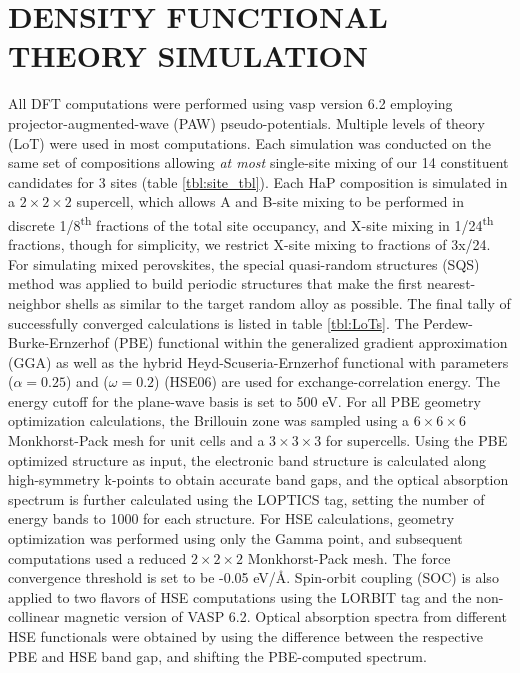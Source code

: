 \chapter{DENSITY FUNCTIONAL THEORY SIMULATION}
\label{sec:orgf20eab4}
All DFT computations were performed using vasp version 6.2 employing projector-augmented-wave (PAW) pseudo-potentials.
\autocite{kresse-1996-effic-iterat,kresse-1993-ab-initio,kresse-1996-effic-ab,kresse-1999-from-ultras,kresse-1994-norm-conser}
Multiple levels of theory (LoT) were used in most computations.
Each simulation was conducted on the same set of compositions allowing \emph{at most} single-site mixing of our 14 constituent candidates for 3 sites (table \ref{tbl:site_tbl}).
Each HaP composition is simulated in a \(2\times{}2\times{}2\) supercell, which allows A and B-site mixing to be performed in discrete 1/8\textsuperscript{th} fractions of the total site occupancy, and X-site mixing in 1/24\textsuperscript{th} fractions, though for simplicity, we restrict X-site mixing to fractions of 3x/24.
For simulating mixed perovskites, the special quasi-random structures (SQS) method was applied to build periodic structures that make the first nearest-neighbor shells as similar to the target random alloy as possible.
\autocite{jiang-2016-special-quasir}
The final tally of successfully converged calculations is listed in table \ref{tbl:LoTs}.
The Perdew-Burke-Ernzerhof (PBE) functional within the generalized gradient approximation (GGA) as well as the hybrid Heyd-Scuseria-Ernzerhof functional with parameters (\(\alpha=0.25\)) and (\(\omega=0.2\)) (HSE06) are used for exchange-correlation energy.
\autocite{perdew-1996-gener-gradien,heyd-2003-hybrid-funct}
The energy cutoff for the plane-wave basis is set to 500 eV.
For all PBE geometry optimization calculations, the Brillouin zone was sampled using a \(6\times{}6\times{}6\) Monkhorst-Pack mesh for unit cells and a \(3\times{}3\times{}3\) for supercells.
Using the PBE optimized structure as input, the electronic band structure is calculated along high-symmetry k-points to obtain accurate band gaps, and the optical absorption spectrum is further calculated using the LOPTICS tag, setting the number of energy bands to 1000 for each structure.
\autocite{hinuma-2016-band-struc,ganose-2018-sumo}
For HSE calculations, geometry optimization was performed using only the Gamma point, and subsequent computations used a reduced \(2\times{}2\times{}2\) Monkhorst-Pack mesh.
The force convergence threshold is set to be -0.05 eV/Å.
Spin-orbit coupling (SOC) is also applied to two flavors of HSE computations using the LORBIT tag and the non-collinear magnetic version of VASP 6.2.
\autocite{steiner-2016-calcul-magnet}
Optical absorption spectra from different HSE functionals were obtained by using the difference between the respective PBE and HSE band gap, and shifting the PBE-computed spectrum.

